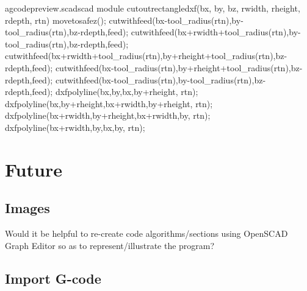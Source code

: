 \documentclass{ltxdoc}
\begin{document}
\lstset{firstnumber=\thegcpscad}
\begin{writecode}{a}{gcodepreview.scad}{scad}
module cutoutrectangledxf(bx, by, bz, rwidth, rheight, rdepth, rtn) {
  movetosafez();
  cutwithfeed(bx-tool_radius(rtn),by-tool_radius(rtn),bz-rdepth,feed);
  cutwithfeed(bx+rwidth+tool_radius(rtn),by-tool_radius(rtn),bz-rdepth,feed);
  cutwithfeed(bx+rwidth+tool_radius(rtn),by+rheight+tool_radius(rtn),bz-rdepth,feed);
  cutwithfeed(bx-tool_radius(rtn),by+rheight+tool_radius(rtn),bz-rdepth,feed);
  cutwithfeed(bx-tool_radius(rtn),by-tool_radius(rtn),bz-rdepth,feed);
  dxfpolyline(bx,by,bx,by+rheight, rtn);
  dxfpolyline(bx,by+rheight,bx+rwidth,by+rheight, rtn);
  dxfpolyline(bx+rwidth,by+rheight,bx+rwidth,by, rtn);
  dxfpolyline(bx+rwidth,by,bx,by, rtn);
}

\end{writecode}
\addtocounter{gcpscad}{13}

%
%
%

\section{Future}

\subsection{Images}

Would it be helpful to re-create code algorithms/sections using OpenSCAD Graph Editor so as to represent/illustrate the program?

%

\subsection{Import G-code}
\end{document}
